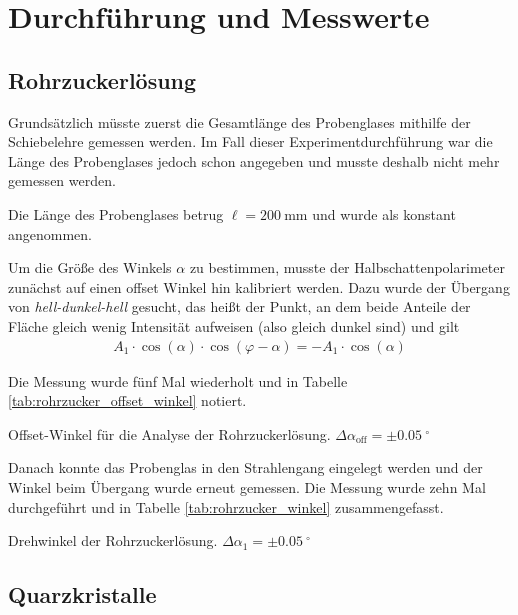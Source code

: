 \documentclass{article}
\begin{document}
\section{Durchführung und Messwerte}

\subsection{Rohrzuckerlösung}

Grundsätzlich müsste zuerst die Gesamtlänge des Probenglases mithilfe der Schiebelehre gemessen werden. Im Fall dieser Experimentdurchführung war die Länge des Probenglases jedoch schon angegeben und musste deshalb nicht mehr gemessen werden.

Die Länge des Probenglases betrug $\ell = 200~$mm und wurde als konstant angenommen.


Um die Größe des Winkels $\alpha$ zu bestimmen, musste der Halbschattenpolarimeter zunächst auf einen offset Winkel hin kalibriert werden. Dazu wurde der Übergang von \textit{hell-dunkel-hell} gesucht, das heißt der Punkt, an dem beide Anteile der Fläche gleich wenig Intensität aufweisen (also gleich dunkel sind) und gilt
\begin{align*}
A_1\cdot\cos(\alpha)\cdot\cos(\varphi-\alpha) = -A_1\cdot\cos(\alpha)
\end{align*}

Die Messung wurde fünf Mal wiederholt und in Tabelle \ref{tab:rohrzucker_offset_winkel} notiert.

\begin{table}[H]
\caption{Offset-Winkel für die Analyse der Rohrzuckerlösung. $\Delta\alpha_\text{off} = \pm 0.05~^\circ$}
\label{tab:rohrzucker_offset_winkel}
\centering

\end{table}



Danach konnte das Probenglas in den Strahlengang eingelegt werden und der Winkel beim Übergang wurde erneut gemessen. Die Messung wurde zehn Mal durchgeführt und in Tabelle \ref{tab:rohrzucker_winkel} zusammengefasst.


\begin{table}[H]
\caption{Drehwinkel der Rohrzuckerlösung. $\Delta\alpha_1 = \pm 0.05~^\circ$}
\label{tab:rohrzucker_winkel}
\centering

\end{table}


\subsection{Quarzkristalle}
\end{document}
